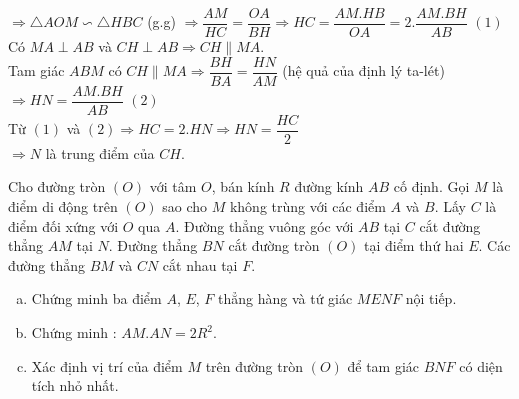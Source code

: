 \begin{vd}
{\begin{enumerate}
			$\Rightarrow \triangle AOM\backsim\triangle HBC$ (g.g)
			$\Rightarrow \dfrac{AM}{HC}=\dfrac{OA}{BH}\Rightarrow HC=\dfrac{AM.HB}{OA}=2.\dfrac{AM.BH}{AB}$ $(1)$\\
			Có $MA\perp AB$ và $CH\perp AB\Rightarrow CH\parallel MA$.\\
			Tam giác $ABM$ có $CH\parallel MA\Rightarrow \dfrac{BH}{BA}=\dfrac{HN}{AM}$ (hệ quả của định lý ta-lét)\\ $\Rightarrow HN=\dfrac{AM.BH}{AB}$ $(2)$\\
			Từ $(1)$ và $(2)\Rightarrow HC=2.HN\Rightarrow HN=\dfrac{HC}{2}$\\
			$\Rightarrow N$ là trung điểm của $CH$.
		\end{enumerate}
	}		
\end{vd}

\begin{vd}%
	Cho đ­ường tròn $(O)$ với tâm $O$, bán kính $R$ đường kính $AB$ cố định. Gọi $M$ là điểm di động trên $(O)$ sao cho $M$ không trùng với các điểm $A$ và $B$. Lấy $C$ là điểm đối xứng với $O$ qua $A$. Đường thẳng vuông góc với $AB$ tại $C$ cắt đường thẳng $AM$ tại $N$. Đường thẳng $BN$ cắt đường tròn $(O)$ tại điểm thứ hai $E$. Các đường thẳng $BM$ và $CN$ cắt nhau tại $F$.
	\begin{enumerate}[a)]
		\item Chứng minh ba điểm $A$, $E$, $F$ thẳng hàng và tứ giác $MENF$ nội tiếp.
		\item Chứng minh : $AM.AN=2R^2$.
		\item Xác định vị trí của điểm $M$ trên đ­ường tròn $(O)$ để tam giác $BNF$ có diện tích nhỏ nhất.
	\end{enumerate}
\end{vd}

